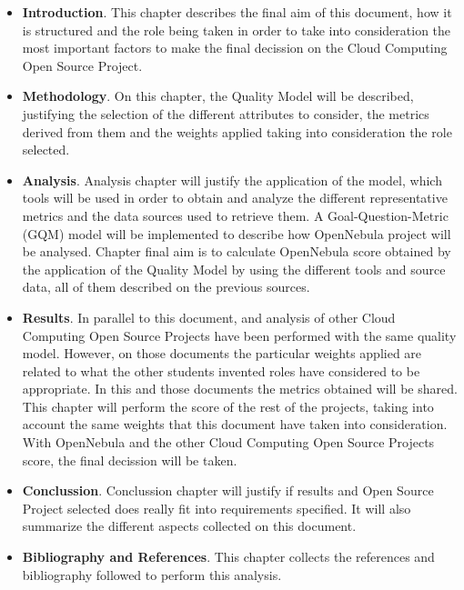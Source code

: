 \documentclass[11pt]{article}
\begin{document}
\begin{itemize}\itemsep0pt
\item{\textbf{Introduction}}. This chapter describes the final aim of this document, how it is structured and the role being taken in order to take into consideration the most important factors to make the final decission on the Cloud Computing Open Source Project.
\item{\textbf{Methodology}}. On this chapter, the Quality Model will be described, justifying the selection of the different attributes to consider, the metrics derived from them and the weights applied taking into consideration the role selected.
\item{\textbf{Analysis}}. Analysis chapter will justify the application of the model, which tools will be used in order to obtain and analyze the different representative metrics and the data sources used to retrieve them. A Goal-Question-Metric (GQM) model will be implemented to describe how OpenNebula project will be analysed. Chapter final aim is to calculate OpenNebula score obtained by the application of the Quality Model by using the different tools and source data, all of them described on the previous sources.
\item{\textbf{Results}}. In parallel to this document, and analysis of other Cloud Computing Open Source Projects have been performed with the same quality model. However, on those documents the particular weights applied are related to what the other students invented roles have considered to be appropriate. In this and those documents the metrics obtained will be shared. This chapter will perform the score of the rest of the projects, taking into account the same weights that this document have taken into consideration. With OpenNebula and the other Cloud Computing Open Source Projects score, the final decission will be taken.
\item{\textbf{Conclussion}}. Conclussion chapter will justify if results and Open Source Project selected does really fit into requirements specified. It will also summarize the different aspects collected on this document.

\item{\textbf{Bibliography and References}}. This chapter collects the references and bibliography followed to perform this analysis.


\end{itemize}
\end{document}

